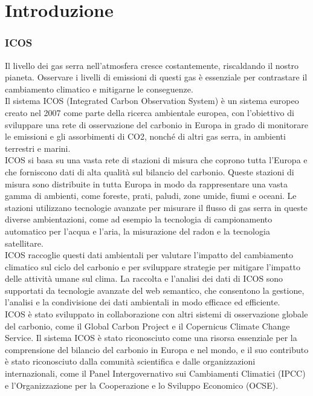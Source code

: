 \chapter{Introduzione}
\subsection{ICOS}

Il livello dei gas serra nell'atmosfera cresce costantemente, riscaldando il nostro pianeta. Osservare 
i livelli di emissioni di questi gas è essenziale per contrastare il cambiamento climatico e mitigarne le 
conseguenze. \\

Il sistema ICOS (Integrated Carbon Observation System) è un sistema europeo creato nel 2007 come parte della ricerca 
ambientale europea, con l'obiettivo di sviluppare una rete di osservazione del carbonio in Europa
in grado di monitorare le emissioni e gli assorbimenti di CO2, nonché di altri gas serra,
in ambienti terrestri e marini. \\

ICOS si basa su una vasta rete di stazioni di misura che coprono tutta l'Europa e che forniscono 
dati di alta qualità sul bilancio del carbonio. Queste stazioni di misura sono distribuite in 
tutta Europa in modo da rappresentare una vasta gamma di ambienti, come foreste, prati, paludi,
zone umide, fiumi e oceani. Le stazioni utilizzano tecnologie avanzate per misurare il flusso
di gas serra in queste diverse ambientazioni, come ad esempio la tecnologia di campionamento 
automatico per l'acqua e l'aria, la misurazione del radon e la tecnologia satellitare.\\

ICOS raccoglie questi dati ambientali per valutare l'impatto del cambiamento climatico
sul ciclo del carbonio e per sviluppare strategie per mitigare l'impatto delle attività
umane sul clima. La raccolta e l'analisi dei dati di ICOS sono supportati da tecnologie 
avanzate del web semantico, che consentono la gestione, l'analisi e la condivisione dei dati 
ambientali in modo efficace ed efficiente. \\

ICOS è stato sviluppato in collaborazione con altri sistemi di osservazione globale del carbonio,
come il Global Carbon Project e il Copernicus Climate Change Service.
Il sistema ICOS è stato riconosciuto come una risorsa essenziale per la comprensione
del bilancio del carbonio in Europa e nel mondo, e il suo contributo è stato riconosciuto
dalla comunità scientifica e dalle organizzazioni internazionali, come il Panel Intergovernativo
sui Cambiamenti Climatici (IPCC) e l'Organizzazione per la Cooperazione e lo Sviluppo Economico (OCSE). \\

